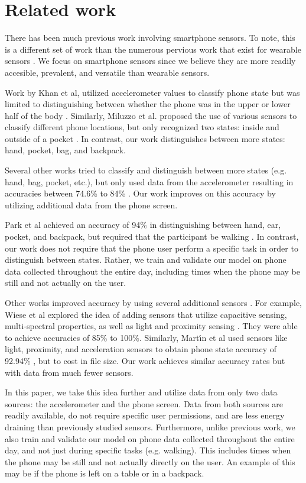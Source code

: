 \section{Related work}
There has been much previous work involving smartphone sensors.
To note, this is a different set of work than the numerous pervious work that exist for wearable sensors \cite{Kunze2005,Atallah}.
We focus on smartphone sensors since we believe they are more readily accesible, prevalent, and versatile than wearable sensors.

Work by Khan et al, utilized accelerometer values to classify phone state 
but was limited to distinguishing between whether the phone was in the upper or lower half of the body \cite{Khan2010}.
Similarly, Miluzzo et al. proposed the use of various sensors to classify different phone locations, 
but only recognized two states: inside and outside of a pocket \cite{Miluzzo2010}.
In contrast, our work distinguishes between more states: hand, pocket, bag, and backpack. 

Several other works tried to classify and distinguish between more states (e.g. hand, bag, pocket, etc.), but only used data from the accelerometer resulting in accuracies between 74.6\% to 84\% \cite{Fujinami2013,Coksun15}. 
Our work improves on this accuracy by utilizing additional data from the phone screen.

Park et al achieved an accuracy of 94\% in distinguishing between hand, ear, pocket, and backpack, but required that the participant be walking \cite{Park2012}. 
In contrast, our work does not require that the phone user perform a specific task in order to distinguish between states.
Rather, we train and validate our model on phone data collected throughout the entire day, 
 including times when the phone may be still and not actually on the user. 

Other works improved accuracy by using several additional sensors \cite{Yang13}.
For example, Wiese et al explored the idea of adding sensors that utilize capacitive sensing,  multi-spectral properties, as well as light and proximity sensing \cite{Wiese2013}.
They were able to achieve accuracies of 85\% to 100\%.
Similarly, Mart\'{\i}n et al used sensors like light, proximity, and acceleration sensors
to obtain phone state accuracy of 92.94\% \cite{Martin2013}, but to cost in file size.
Our work achieves similar accuracy rates but with data from much fewer sensors.  

In this paper, we take this idea further and utilize data from only two data sources: the accelerometer and the phone screen. 
Data from both sources are readily available, do not require specific user permissions, and are less energy draining than previously studied sensors.
Furthermore, unlike previous work, we also train and validate our model on phone data collected throughout the entire day, and not just during specific tasks (e.g. walking).
This includes times when the phone may be still and not actually directly on the user.
An example of this may be if the phone is left on a table or in a backpack. 







